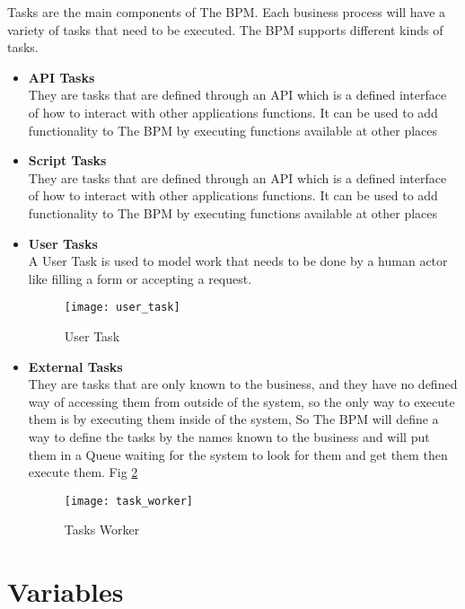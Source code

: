 Tasks are the main components of The BPM. Each business process will have a variety of tasks that
need to be executed. The BPM supports different kinds of tasks.

\begin{itemize}
    \item \textbf{API Tasks} \\
    They are tasks that are defined through an API which is a defined interface of how to interact
    with other applications functions. It can be used to add functionality to The BPM by
    executing functions available at other places
    \item \textbf{Script Tasks} \\
    They are tasks that are defined through an API which is a defined interface of how to interact
    with other applications functions. It can be used to add functionality to The BPM by
    executing functions available at other places
    \item \textbf{User Tasks} \\
    A User Task is used to model work that needs to be done by a human actor like filling a form
or accepting a request.

\begin{figure}[h]
    \texttt{[image: user\_task]}
    \centering
    \caption{User Task}
    \label{fig:user_task}
\end{figure}

    \item \textbf{External Tasks} \\
    They are tasks that are only known to the business, and they have no defined way of accessing
them from outside of the system, so the only way to execute them is by executing them inside
of the system, So The BPM will define a way to define the tasks by the names known to the
business and will put them in a Queue waiting for the system to look for them and get them
then execute them. Fig \ref{fig:task_worker}

\begin{figure}[h]
    \texttt{[image: task\_worker]}
    \centering
    \caption{Tasks Worker}
    \label{fig:task_worker}
\end{figure}

\end{itemize}

\section{Variables}

